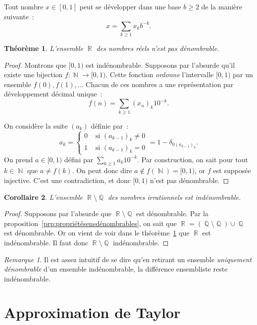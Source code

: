 \documentclass{article}
\DeclareMathOperator{\N}{\mathbb N}
\DeclareMathOperator{\Q}{\mathbb Q}
\DeclareMathOperator{\R}{\mathbb R}
\newtheorem{thm}{Théorème}[section]
\newtheorem{cor}[thm]{Corollaire}
\theoremstyle{definition}
\theoremstyle{remark}
\newtheorem*{rmq}{Remarque}
\begin{document}
		Tout nombre $x \in [0, 1]$ peut se développer dans une base $b \geq 2$ de la manière suivante~:
		\[x = \sum_{k \geq 1}x_kb^{-k}.\]

		\begin{thm}\label{thm:Rindénombrable} L'ensemble $\R$ des nombres réels n'est pas dénombrable. \end{thm}

		\begin{proof} Montrons que $[0, 1)$ est indénombrable. Supposons par l'absurde qu'il existe une bijection $f : \N \to [0, 1)$. Cette fonction
		\emph{ordonne} l'intervalle $[0, 1)$ par un ensemble $f(0), f(1), \ldots$ Chacun de ces nombres a une représentation par développement décimal unique~:
		\[f(n) = \sum_{k \geq 1}(x_n)_k10^{-k}.\]

		On considère la suite $(a_k)$ définie par~:
		\[a_k = \begin{cases}0 &\text{ si } (a_{k-1})_k \neq 0 \\ 1 &\text{ si }(a_{k-1})_k = 0\end{cases} = 1 - \delta_{0 (a_{k-1})_k}.\]
		On prend $a \in [0, 1)$ défini par $\sum_{k \geq 1}a_k10^{-k}$. Par construction, on sait pour tout $k \in \N$ que $a \neq f(k)$. On peut donc
		dire $a \not \in f(\N) = [0, 1)$, or $f$ est supposée injective. C'est une contradiction, et donc $[0, 1)$ n'est pas dénombrable.
		\end{proof}

		\begin{cor} L'ensemble $\R \setminus \Q$ des nombres irrationnels est indénombrable. \end{cor}

		\begin{proof} Supposons par l'absurde que $\R \setminus \Q$ est dénombrable. Par la proposition~\ref{prp:propriétésensdénombrables}, on sait que
		$\R = (\Q \setminus \Q) \cup \Q$ est dénombrable. Or on vient de voir dans le théorème~\ref{thm:Rindénombrable} que $\R$ est indénombrable. Il faut donc
		$\R \setminus \Q$ indénombrable.
		\end{proof}

		\begin{rmq} Il est assez intuitif de se dire qu'en retirant un ensemble \emph{uniquement dénombrable} d'un ensemble indénombrable, la différence
		ensembliste reste indénombrable.
		\end{rmq}

\newpage
\section{Approximation de Taylor}
\end{document}
